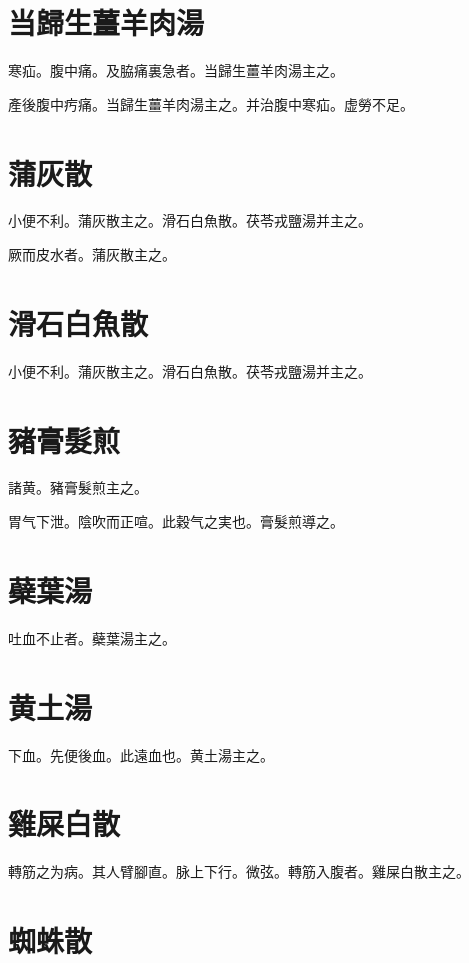 \documentclass[12pt,oneside,UTF8,b5paper]{ctexbook}她她她她她她她
\begin{document}
\section{当歸生薑羊肉湯}

寒疝。腹中痛。及脇痛裏急者。当歸生薑羊肉湯主之。

產後腹中㽲痛。当歸生薑羊肉湯主之。并治腹中寒疝。虚勞不足。

\section{蒲灰散}

小便不利。蒲灰散主之。滑石白魚散。茯苓戎鹽湯并主之。

厥而皮水者。蒲灰散主之。

\section{滑石白魚散}

小便不利。蒲灰散主之。滑石白魚散。茯苓戎鹽湯并主之。

\section{豬膏髮煎}

諸黄。豬膏髮煎主之。

胃气下泄。陰吹而正喧。此穀气之実也。膏髮煎導之。

\section{蘗葉湯}

吐血不止者。蘗葉湯主之。

\section{黄土湯}

下血。先便後血。此遠血也。黄土湯主之。

\section{雞屎白散}

轉筋之为病。其人臂腳直。脉上下行。微弦。轉筋入腹者。雞屎白散主之。

\section{蜘蛛散}
\end{document}
